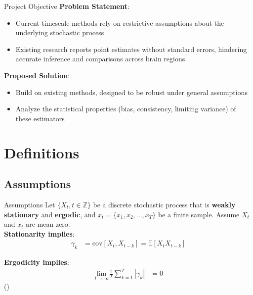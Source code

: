 \documentclass[12pt]{beamer}
\begin{document}
\begin{frame}{Project Objective}
\footnotesize
\textbf{Problem Statement}:
\begin{itemize}
    \item Current timescale methods rely on restrictive assumptions about the underlying stochastic process
    \item Existing research reports point estimates without standard errors, hindering accurate inference and comparisons across brain regions
\end{itemize}
\textbf{Proposed Solution}:
\begin{itemize}
    \item Build on existing methods, designed to be robust under general assumptions
    \item Analyze the statistical properties (bias, consistency, limiting variance) of these estimators
\end{itemize}
\end{frame}

\section{Definitions}

\subsection{Assumptions}
\begin{frame}{Assumptions}
\footnotesize
Let $\{X_t, t\in \mathbb{Z}\}$ be a discrete stochastic process that is \textbf{weakly stationary} and \textbf{ergodic}, and $x_t = \{x_1, x_2, ..., x_T\}$ be a finite sample. Assume $X_t$ and $x_t$ are mean zero.\\
\vspace{0.25cm}
\textbf{Stationarity implies}:
\begin{align}
    \gamma_k &= \text{cov}[X_t, X_{t-k}] = \mathbb{E}[X_t X_{t-k}]
\end{align}

\textbf{Ergodicity implies}:
\begin{align}
    \underset{T\to\infty}{\text{lim}} \frac{1}{T} \sum_{k=1}^T |\gamma_k| &= 0
\end{align}
(\cite{hansen_econometrics_2022})\\
\end{frame}

\end{document}
